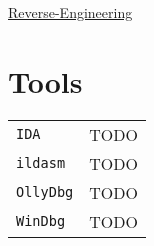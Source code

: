 \raggedright
\footnotesize
\begin{multicols}{3}	
	\setlength{\premulticols}{1pt}
	\setlength{\postmulticols}{1pt}
	\setlength{\multicolsep}{1pt}
	\setlength{\columnsep}{2pt}

\begin{center}
     \Large{\underline{Reverse-Engineering}} \\
\end{center}

\section{Tools}
\begin{tabular}{@{}p{\the\MyLen}
		@{}p{\linewidth-\the\MyLen}@{}}
	\texttt{IDA} &  TODO\\
	\texttt{ildasm} &  TODO\\
	\texttt{OllyDbg} &  TODO\\
	\texttt{WinDbg} &  TODO\\
\end{tabular}
\lipsum
\end{multicols}